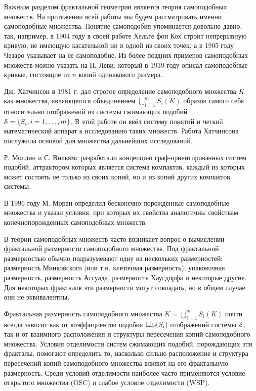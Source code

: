 Важным разделом фрактальной геометрии является теория самоподобных множеств.
На протяжении всей работы мы будем рассматривать именно самоподобные множества.
Понятие самоподобия упоминается довольно давно, так, например, в 1904 году в своей работе \cite{Koch} Хельге фон Кох строит  непрерывную кривую, не имеющую касательной ни в одной из своих точек, а в 1905 году Чезаро \cite{Ces} указывает на ее самоподобие.
Из более поздних примеров самоподобных множеств можно указать на П. Леви, который в 1939 году \cite{Levy1939} описал самоподобные кривые, состоящие из $n$ копий одинакового размера.

Дж. Хатчинсон в 1981 г. \cite{Hut1981} дал строгое определение самоподобного множества $K$ как множества, являющегося объединением $\bigcup_{i=1}^mS_i(K)$ образов самого себя относительно отображений из системы сжимающих подобий ${\EuScript S}=\{S_i, i=1,\ldots,m\}$. 
В этой работе он ввёл систему понятий и четкий математический аппарат к исследованию таких множеств. 
Работа Хатчинсона послужила основой для множества дальнейших исследований.

Р. Молдин и С. Вильямс \cite{MW1988} разработали концепцию граф-ориентированных систем подобий, аттрактором которых является система компактов, каждый из которых может состоять не только из своих копий, но и из копий других компактов системы.

В 1996 году М. Моран \cite{Moran1996} определил бесконечно-порождённые самоподобные множества и указал условия, при которых их свойства аналогичны свойствам конечнопорожденных самоподобных множеств.

В теории самоподобных множеств часто возникает вопрос о вычислении фрактальной размерности самоподобного множества.
Под фрактальной размерностью обычно подразумевают одну из нескольких размерностей: размерность Минковского (или т.н. клеточная размерность), упаковочная размерность, размерность Ассуада, размерность Хаусдорфа и некоторые другие.
Для некоторых фракталов эти размерности могут совпадать, но в общем случае они не эквивалентны.

Фрактальная размерность самоподобного множества $K=\bigcup_{i=1}^mS_i(K)$ почти всегда зависит как от коэффициентов подобия $\mathop{\rm Lip} \nolimits(S_i)$ отображений системы ${\EuScript S}$, так и от взаимного расположения и структуры пересечения копий самоподобного множества.
Условия отделимости систем сжимающих подобий, порождающих эти фракталы, помогают определить то, насколько  сильно расположение и  структура пересечений копий самоподобного множества влияют на его фрактальную размерность.
Среди условий отделимости наиболее часто применяются условие открытого множества (OSC) и слабое условие отделимости (WSP).

